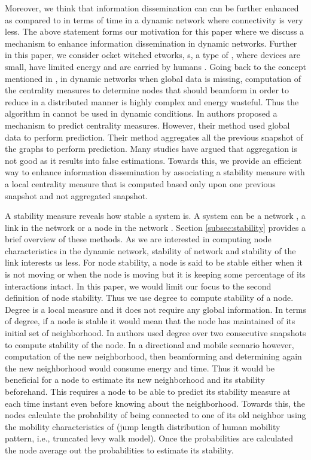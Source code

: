 \documentclass[preprint, twocolumn,5p]{elsarticle}
\begin{document}
Moreover, we think that information dissemination can can be further enhanced as compared to \cite{Peruani2010,Li2012} in terms of time in a dynamic network where connectivity is very less. The above statement forms our motivation for this paper where we discuss a mechanism to enhance information dissemination in dynamic networks. Further in this paper, we consider ocket witched etworks, s, a type of , where devices are small, have limited energy and are carried by humans \cite{Hui2005a,Hui2005,Chaintreau2005}. Going back to the concept mentioned in \cite{Agarwal2011,Agarwal2012}, in dynamic networks when global data is missing, computation of the centrality measures to determine nodes that should beamform in order to reduce  in a distributed manner is highly complex and energy wasteful. Thus the algorithm in \cite{Agarwal2011,Agarwal2012} cannot be used in dynamic conditions. In \cite{Kim2012a} authors proposed a mechanism to predict centrality measures. However, their method used global data to perform prediction. Their method aggregates all the previous snapshot of the graphs to perform prediction. Many studies have argued that aggregation is not good as it results into false estimations. Towards this, we provide an efficient way to enhance information dissemination by associating a stability measure with a local centrality measure that is computed based only upon one previous snapshot and not aggregated snapshot.

A stability measure reveals how stable a system is. A system can be a network \cite{Jurman2010,Hanneke2010,Tang2010,Braha2006,Braha2009}, a link in the network \cite{Zayani2012} or a node in the network \cite{Brust2007}. Section \ref{subsec:stability} provides a brief overview of these methods. As we are interested in computing node characteristics in the dynamic network, stability of network and stability of the link interests us less. For node stability, a node is said to be stable either when it is not moving or when the node is moving but it is keeping some percentage of its interactions intact. In this paper, we would limit our focus to the second definition of node stability. Thus we use degree to compute stability of a node. Degree is a local measure and it does not require any global information. In terms of degree, if a node is  stable it would mean that the node has maintained  of its initial set of neighborhood. In \cite{Brust2007} authors used degree over two consecutive snapshots to compute stability of the node. In a directional and mobile scenario however, computation of the new neighborhood, then beamforming and determining again the new neighborhood would consume energy and time. Thus it would be beneficial for a node to estimate its new neighborhood and its stability beforehand. This requires a node to be able to predict its stability measure at each time instant even before knowing about the neighborhood. Towards this, the nodes calculate the probability of being connected to one of its old neighbor using the mobility characteristics of  (jump length distribution of human mobility pattern, i.e., truncated levy walk model). Once the probabilities are calculated the node average out the probabilities to estimate its stability.
\end{document}
